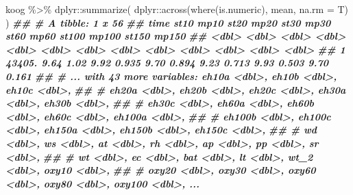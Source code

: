 \documentclass[
]{article}
\newenvironment{Shaded}{\begin{snugshade}}{\end{snugshade}}
\newcommand{\AttributeTok}[1]{\textcolor[rgb]{0.77,0.63,0.00}{#1}}
\newcommand{\DocumentationTok}[1]{\textcolor[rgb]{0.56,0.35,0.01}{\textbf{\textit{#1}}}}
\newcommand{\FunctionTok}[1]{\textcolor[rgb]{0.00,0.00,0.00}{#1}}
\newcommand{\NormalTok}[1]{#1}
\newcommand{\SpecialCharTok}[1]{\textcolor[rgb]{0.00,0.00,0.00}{#1}}
\begin{document}
\begin{Shaded}
\begin{Highlighting}[]
\NormalTok{koog }\SpecialCharTok{\%\textgreater{}\%}
\NormalTok{  dplyr}\SpecialCharTok{::}\FunctionTok{summarize}\NormalTok{(}
\NormalTok{    dplyr}\SpecialCharTok{::}\FunctionTok{across}\NormalTok{(}\FunctionTok{where}\NormalTok{(is.numeric), mean, }\AttributeTok{na.rm =}\NormalTok{ T)}
\NormalTok{    )}
\DocumentationTok{\#\# \# A tibble: 1 x 56}
\DocumentationTok{\#\#     time  st10  mp10  st20  mp20  st30  mp30  st60  mp60 st100 mp100 st150 mp150}
\DocumentationTok{\#\#    \textless{}dbl\textgreater{} \textless{}dbl\textgreater{} \textless{}dbl\textgreater{} \textless{}dbl\textgreater{} \textless{}dbl\textgreater{} \textless{}dbl\textgreater{} \textless{}dbl\textgreater{} \textless{}dbl\textgreater{} \textless{}dbl\textgreater{} \textless{}dbl\textgreater{} \textless{}dbl\textgreater{} \textless{}dbl\textgreater{} \textless{}dbl\textgreater{}}
\DocumentationTok{\#\# 1 43405.  9.64  1.02  9.92 0.935  9.70 0.894  9.23 0.713  9.93 0.503  9.70 0.161}
\DocumentationTok{\#\# \# ... with 43 more variables: eh10a \textless{}dbl\textgreater{}, eh10b \textless{}dbl\textgreater{}, eh10c \textless{}dbl\textgreater{},}
\DocumentationTok{\#\# \#   eh20a \textless{}dbl\textgreater{}, eh20b \textless{}dbl\textgreater{}, eh20c \textless{}dbl\textgreater{}, eh30a \textless{}dbl\textgreater{}, eh30b \textless{}dbl\textgreater{},}
\DocumentationTok{\#\# \#   eh30c \textless{}dbl\textgreater{}, eh60a \textless{}dbl\textgreater{}, eh60b \textless{}dbl\textgreater{}, eh60c \textless{}dbl\textgreater{}, eh100a \textless{}dbl\textgreater{},}
\DocumentationTok{\#\# \#   eh100b \textless{}dbl\textgreater{}, eh100c \textless{}dbl\textgreater{}, eh150a \textless{}dbl\textgreater{}, eh150b \textless{}dbl\textgreater{}, eh150c \textless{}dbl\textgreater{},}
\DocumentationTok{\#\# \#   wd \textless{}dbl\textgreater{}, ws \textless{}dbl\textgreater{}, at \textless{}dbl\textgreater{}, rh \textless{}dbl\textgreater{}, ap \textless{}dbl\textgreater{}, pp \textless{}dbl\textgreater{}, sr \textless{}dbl\textgreater{},}
\DocumentationTok{\#\# \#   wt \textless{}dbl\textgreater{}, ec \textless{}dbl\textgreater{}, bat \textless{}dbl\textgreater{}, lt \textless{}dbl\textgreater{}, wt\_2 \textless{}dbl\textgreater{}, oxy10 \textless{}dbl\textgreater{},}
\DocumentationTok{\#\# \#   oxy20 \textless{}dbl\textgreater{}, oxy30 \textless{}dbl\textgreater{}, oxy60 \textless{}dbl\textgreater{}, oxy80 \textless{}dbl\textgreater{}, oxy100 \textless{}dbl\textgreater{}, ...}
\end{Highlighting}
\end{Shaded}
\end{document}
